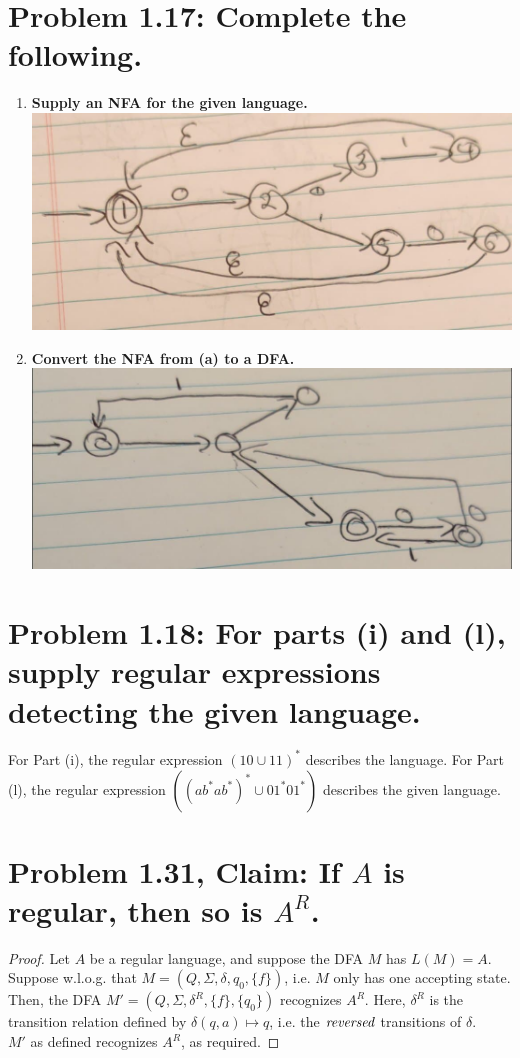 \documentclass[12pt]{article}
\begin{document}
\section*{Problem 1.17: Complete the following.}
\begin{enumerate}[label=(\alph*)]
	\item \textbf{Supply an NFA for the given language.} \\
		\newline
		\includegraphics[width=0.5\linewidth]{problem117a.jpg}
	\item \textbf{Convert the NFA from (a) to a DFA.} \\
		\newline
		\includegraphics[width=0.5\linewidth]{problem117b.jpg}
\end{enumerate}

\section*{Problem 1.18: For parts (i) and (l), supply regular expressions detecting the given language.}
For Part (i), the regular expression $(10 \cup 11)^{*}$ describes the language. For Part (l), the regular expression $((ab^{*}ab^{*})^{*} \cup 01^{*}01^{*})$ describes the given language.

\section*{Problem 1.31, Claim: If $A$ is regular, then so is $A^{R}$.}
\begin{proof}
	Let $A$ be a regular language, and suppose the DFA $M$ has $L(M) = A$. Suppose w.l.o.g. that $M = (Q, \Sigma, \delta, q_{0}, \{f\})$, i.e. $M$ only has one accepting state. Then, the DFA $M' = (Q, \Sigma, \delta^{R}, \{f\}, \{q_{0}\})$ recognizes $A^{R}$. Here, $\delta^{R}$ is the transition relation defined by $\delta(q, a) \mapsto q$, i.e. the $\it{reversed}$ transitions of $\delta$. \\
	\newline
	$M'$ as defined recognizes $A^{R}$, as required.
\end{proof}
\end{document}
